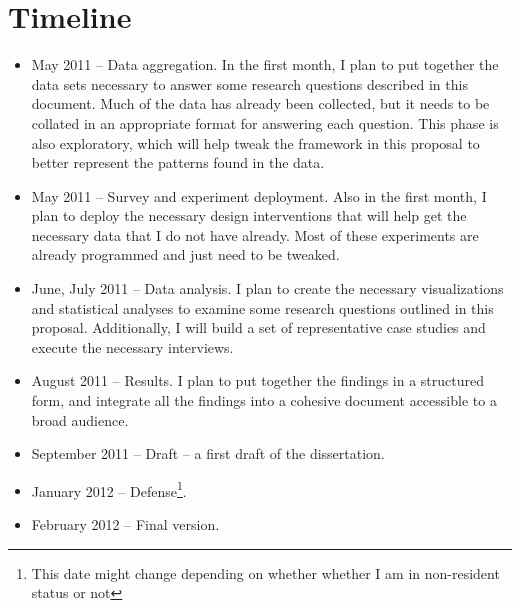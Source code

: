 \section{Timeline}
\begin{itemize}
\item May 2011 -- Data aggregation. In the first month, I plan to put together the data sets necessary to answer some research questions described in this document. Much of the data has already been collected, but it needs to be collated in an appropriate format for answering each question.
This phase is also exploratory, which will help tweak the framework in this proposal to better represent the patterns found in the data.
\item May 2011 -- Survey and experiment deployment. Also in the first month, I plan to deploy the necessary design interventions that will help get the necessary data that I do not have already. Most of these experiments are already programmed and just need to be tweaked.
\item June, July 2011 -- Data analysis. I plan to create the necessary visualizations and statistical analyses to examine some research questions outlined in this proposal. Additionally, I will build a set of representative case studies and execute the necessary interviews.
\item August 2011 -- Results. I plan to put together the findings in a structured form, and integrate all the findings into a cohesive document accessible to a broad audience.
\item September 2011 -- Draft -- a first draft of the dissertation.
\item January 2012 -- Defense\footnote{This date might change depending on whether whether I am in non-resident status or not}.
\item February 2012 -- Final version.
\end{itemize}
